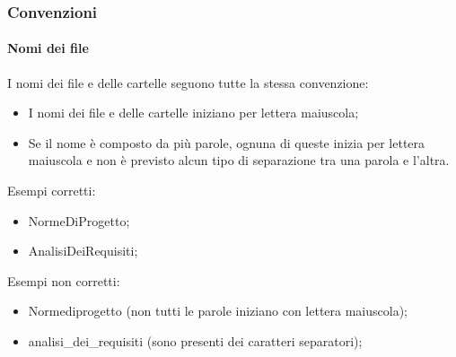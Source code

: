\subsubsection{Convenzioni}

\paragraph{Nomi dei file}
I nomi dei file e delle cartelle seguono tutte la stessa convenzione:

\begin{itemize}

	\item I nomi dei file e delle cartelle iniziano per lettera maiuscola;
	
	\item Se il nome è composto da più parole, ognuna di queste inizia per lettera maiuscola e non è previsto alcun tipo di separazione tra una parola e l'altra.
	
\end{itemize}

Esempi corretti:

\begin{itemize}

	\item NormeDiProgetto;
	
	\item AnalisiDeiRequisiti;
	
\end{itemize}

Esempi non corretti:

\begin{itemize}

	\item Normediprogetto (non tutti le parole iniziano con lettera maiuscola);
	
	\item analisi\_dei\_requisiti (sono presenti dei caratteri separatori);
\end{itemize}

